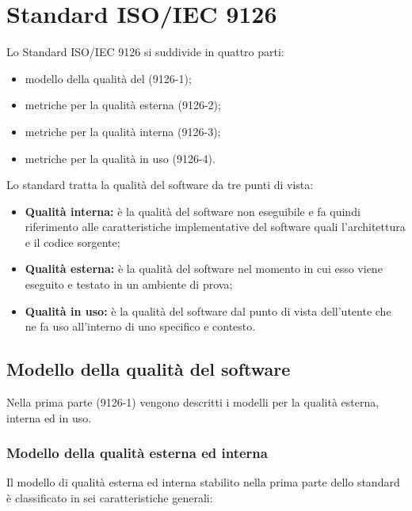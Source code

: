 \documentclass[PianoDiQualifica.tex]{subfiles}
\begin{document}
\hypertarget{ISOIEC}{\section{Standard ISO/IEC 9126}}
Lo Standard ISO/IEC 9126 si suddivide in quattro parti:
\begin{itemize}
\item modello della qualità del  (9126-1);
\item metriche per la qualità esterna (9126-2);
\item metriche per la qualità interna (9126-3);
\item metriche per la qualità in uso (9126-4).
\end{itemize}

Lo standard tratta la qualità del software da tre punti di vista:
\begin{itemize}
\item \textbf{Qualità interna:}  è la qualità del software non eseguibile e
fa quindi riferimento alle caratteristiche implementative del software
quali l’architettura e il codice sorgente;
\item \textbf{Qualità esterna:} è la qualità del software nel
momento in cui esso viene eseguito e testato in un ambiente di prova;
\item \textbf{Qualità in uso:} è la qualità del software dal punto di vista dell’utente che ne fa uso all’interno di uno specifico  e contesto.
\end{itemize}
\subsection{Modello della qualità del software}
Nella prima parte (9126-1) vengono descritti i modelli per la qualità esterna, interna
ed in uso.

\subsubsection{Modello della qualità esterna ed interna}

Il modello di qualità esterna ed interna stabilito nella prima parte dello
standard è classificato in sei caratteristiche generali:
\end{document}
